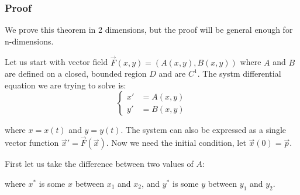\documentclass[11 pt, twoside]{article}
\begin{document}
\subsubsection{Proof}
We prove this theorem in 2 dimensions, but the proof will be general enough for
n-dimensions.

Let us start with vector field $\vec{F}(x, y) = (A(x, y), B(x, y))$ where $A$
and $B$ are defined on a closed, bounded region $D$ and are $C^1$. The systm
differential equation we are trying to solve is:
\[
\begin{cases}
x' &= A(x, y)\\
y' &= B(x, y)
\end{cases}
\]

where $x = x(t)$ and $y = y(t)$. The system can also be expressed as a single
vector function $\vec{x}' = \vec{F}(\vec{x})$. Now we need the initial
condition, let $\vec{x}(0) = \vec{p}$.

First let us take the difference between two values of $A$:

where $x^*$ is some $x$ between $x_1$ and $x_2$, and $y^*$ is some $y$ between
$y_1$ and $y_2$.


\end{document}
